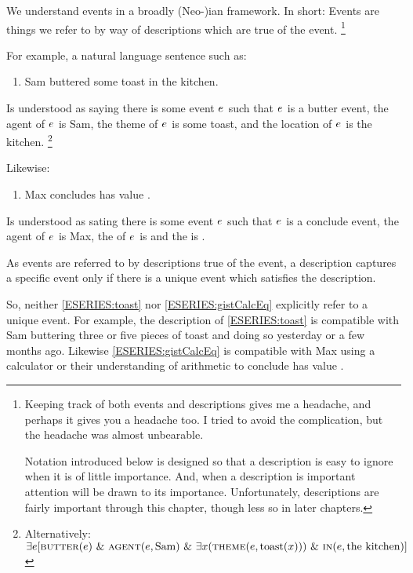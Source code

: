 \begin{note}
  We understand events in a broadly (Neo-)\citeauthor{Davidson:1967aa}ian framework.
  In short:
  Events are things we refer to by way of descriptions which are true of the event.%
    \footnote{
      Keeping track of both events and descriptions gives me a headache, and perhaps it gives you a headache too.
      I tried to avoid the complication, but the headache was almost unbearable.

      Notation introduced below is designed so that a description is easy to ignore when it is of little importance.
      And, when a description is important attention will be drawn to its importance.
      Unfortunately, descriptions are fairly important through this chapter, though less so in later chapters.
    }

  For example, a natural language sentence such as:
  \begin{enumerate}[label=\arabic*., ref=(\arabic*), series=ESERIES]
  \item
    \label{ESERIES:toast}
    Sam buttered some toast in the kitchen.
  \end{enumerate}
  Is understood as saying there is some event \(e\sb{}\) such that \(e\sb{}\) is a butter event, the agent of \(e\sb{}\) is Sam, the theme of \(e\sb{}\) is some toast, and the location of \(e\sb{}\) is the kitchen.%
  \footnote{
    Alternatively:
    \(\exists e [\textsc{butter}(e)\text{ \& }\textsc{agent}(e, \text{Sam})\text{ \& }\exists x(\textsc{theme}(e, \text{toast}(x)))\text{ \& }\textsc{in}(e, \text{the kitchen})]\)
  }

  Likewise:
  \begin{enumerate}[label=\arabic*., ref=(\arabic*), resume*=ESERIES]
  \item
    \label{ESERIES:gistCalcEq}
    Max concludes \gistCalcEq{} has value .
  \end{enumerate}
  Is understood as sating there is some event \(e\sb{}\) such that \(e\sb{}\) is a conclude event, the agent of \(e\sb{}\) is Max, the  of \(e\sb{}\) is \gistCalcEq{} and the \val{} is .

  As events are referred to by descriptions true of the event, a description captures a specific event only if there is a unique event which satisfies the description.

  So, neither \ref{ESERIES:toast} nor \ref{ESERIES:gistCalcEq} explicitly refer to a unique event.
  For example, the description of \ref{ESERIES:toast} is compatible with Sam buttering three or five pieces of toast and doing so yesterday or a few months ago.
  Likewise \ref{ESERIES:gistCalcEq} is compatible with Max using a calculator or their understanding of arithmetic to conclude \gistCalcEq{} has value .


\end{note}
